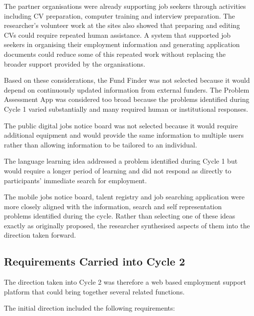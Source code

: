 The partner organisations were already supporting job seekers through activities including CV preparation, computer training and interview preparation. The researcher's volunteer work at the sites also showed that preparing and editing CVs could require repeated human assistance. A system that supported job seekers in organising their employment information and generating application documents could reduce some of this repeated work without replacing the broader support provided by the organisations.


Based on these considerations, the Fund Finder was not selected because it would depend on continuously updated information from external funders. The Problem Assessment App was considered too broad because the problems identified during Cycle 1 varied substantially and many required human or institutional responses.

The public digital jobs notice board was not selected because it would require additional equipment and would provide the same information to multiple users rather than allowing information to be tailored to an individual.

The language learning idea addressed a problem identified during Cycle 1 but would require a longer period of learning and did not respond as directly to participants' immediate search for employment.

The mobile jobs notice board, talent registry and job searching application were more closely aligned with the information, search and self representation problems identified during the cycle. Rather than selecting one of these ideas exactly as originally proposed, the researcher synthesised aspects of them into the direction taken forward.


\subsection{Requirements Carried into Cycle 2}

The direction taken into Cycle 2 was therefore a web based employment support platform that could bring together several related functions.

The initial direction included the following requirements:

